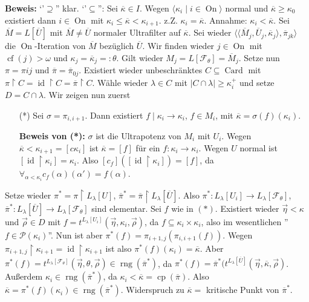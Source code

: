 \documentclass[a4paper,fontsize=11pt]{scrartcl}
\newcommand{\rng}{\operatorname{rng}}
\newcommand{\Card}{\operatorname{Card}}
\newcommand{\On}{\operatorname{On}}
\newcommand{\cf}{\operatorname{cf}}
\newcommand{\id}{\operatorname{id}}
\newcommand{\cp}{\operatorname{cp}}
\renewcommand{\bar}[1]{\overline{#1}}
\begin{document}
	{\bf Beweis:} `'$\supseteq$'' klar. `'$\subseteq$'': Sei $\bar\kappa\in I$. 
		Wegen $\langle\kappa_i\mid i\in\On\rangle$ normal und $\bar\kappa\ge\kappa_0$ existiert dann $i\in\On$ mit $\kappa_i\le\bar\kappa<\kappa_{i+1}$.
		z.Z. $\kappa_i=\bar\kappa$.
		Annahme: $\kappa_i<\bar\kappa$.
		Sei $\bar M=L[\bar U]$ mit $\bar M\neq\bar U$ normaler Ultrafilter auf $\bar\kappa$.
		Sei wieder $\langle\langle \bar M_j,\bar U_j,\bar\kappa_j\rangle,\bar\pi_{jk}\rangle$ die $\On$-Iteration von $\bar M$ bezüglich $\bar U$.
		Wir finden wieder $j\in\On$ mit $\cf(j)>\omega$ und $\kappa_j=\bar\kappa_j=:\theta$.
		Gilt wieder $M_j=L[\mathcal F_{\theta}] = \bar M_j$.
		Setze nun $\pi=\pi{ij}$ und $\bar\pi=\bar\pi_{0j}$.
		Existiert wieder unbeschränktes $C\subseteq\Card$ mit $\pi\upharpoonright C=\id\upharpoonright C=\bar\pi\upharpoonright C$.
		Wähle wieder $\lambda\in C$ mit $|C\cap\lambda|\ge\kappa^+_i$ und setze $D=C\cap\lambda$.
		Wir zeigen nun zuerst \begin{itemize}\item[(*)] Sei $\sigma=\pi_{i,i+1}$. 
		Dann existiert $f\mid\kappa_i\to\kappa_i$, $f\in M_i$, mit $\bar\kappa=\sigma(f)(\kappa_i)$.

		{\bf Beweis von (*):} $\sigma$ ist die Ultrapotenz von $M_i$ mit $U_i$.
			Wegen $\bar\kappa<\kappa_{i+1}=[c{\kappa_i}]$ ist $\bar\kappa=[f]$ für ein $f\colon\kappa_i\to\kappa_i$.
			Wegen $U$ normal ist $[\id\upharpoonright\kappa_i]=\kappa_i$.
			Also $[c_f]([\id\upharpoonright\kappa_i])=[f]$, da $\forall_{\alpha<\kappa_i} c_f(\alpha)(\alpha')=f(\alpha)$.
		\end{itemize}
		
		Setze wieder $\pi^*=\pi\upharpoonright L_{\lambda}[U]$, $\bar\pi^*=\bar\pi\upharpoonright L_{\lambda}[\bar U]$.  Also $\pi^*\colon
                L_{\lambda}[U_i]\to L_{\lambda}[\mathcal F_{\theta}]$, $\bar\pi^*\colon L_{\lambda}[\bar U]\to L_{\lambda}[\mathcal F_{\theta}]$ sind
                elementar.  Sei $f$ wie in $(*)$.  Existiert wieder $\vec\eta<\kappa$ und $\vec\rho\in D$ mit
                $f=t^{L_{\lambda}[U_i]}(\vec\eta,\kappa_i,\vec\rho)$, da $f\subseteq \kappa_i\times\kappa_i$, also im wesentlichen ''$f\in\mathcal
                P(\kappa_i)$''.  Nun ist aber $\pi^*(f)=\pi_{i+1,j}(\pi_{i,i+1}(f))$.  Wegen $\pi_{i+1,j}\upharpoonright\kappa_{i+1}
                =\id\upharpoonright\kappa_{i+1}$ ist also $\pi^*(f)(\kappa_i)=\bar\kappa$.  Aber $\pi^*(f)=t^{L_{\lambda}[\mathcal
                    F_{\theta}]}(\vec\eta,\theta,\vec\rho)\in\rng(\bar\pi^*)$, da $\pi^*(f)=\bar\pi^*(t^{L_{\lambda}[\bar
                    U]}(\vec\eta,\bar\kappa,\vec\rho)$.  Außerdem $\kappa_i\in\rng(\bar\pi^*)$, da $\kappa_i<\bar\kappa=\cp(\bar\pi)$.  Also
                $\bar\kappa=\pi^*(f)(\kappa_i)\in\rng(\bar\pi^*)$.  Widerspruch zu $\bar\kappa=$ kritische Punkt von $\bar\pi^*$.
\end{document}
